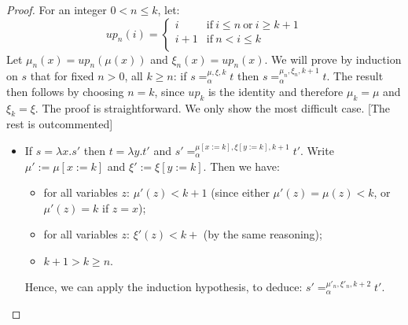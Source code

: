 \documentclass{lmcs}
\theoremstyle{theorem}\newtheorem{theorem}{Theorem}
\theoremstyle{theorem}\newtheorem{lemma}[theorem]{Lemma}
\theoremstyle{theorem}\newtheorem{corollary}[theorem]{Corollary}
\theoremstyle{definition}\newtheorem{definition}[theorem]{Definition}
\theoremstyle{definition}\newtheorem{example}[theorem]{Example}
\newcommand{\Vfree}{\mathcal{V}_{\mathit{nonb}}}
\newcommand{\Vbound}{\mathcal{V}_{\mathit{binder}}}
\newcommand{\identifier}[1]{\mathtt{#1}}
\newcommand{\afun}{\identifier{f}}
\newcommand{\avar}{x}
\newcommand{\bvar}{y}
\newcommand{\Avar}{X}
\newcommand{\abs}[2]{\lambda #1.#2}
\newcommand{\meta}[2]{#1\langle#2\rangle}
\newcommand{\tuple}[2]{\llparenthesis #1,\dots,#2 \rrparenthesis}
\begin{document}
\begin{proof}
For an integer $0 < n \leq k$, let:
\[\mathit{up}_n(i) = \left\{
\begin{array}{ll}
i & \text{if}\ i \leq n\ \text{or}\ i \geq k+1 \\
i+1 & \text{if}\ n < i \leq k \\
\end{array}
\right.
\]
Let $\mu_n(x) = \mathit{up}_n(\mu(x))$ and $\xi_n(x) = \mathit{up}_n(x)$.
We will prove by induction on $s$ that for fixed $n > 0$, all $k \geq n$:
if $s =_\alpha^{\mu,\xi,k} t$ then $s =_\alpha^{\mu_n,\xi_n,k+1} t$.
The result then follows by choosing $n = k$, since $\mathit{up}_k$ is the
identity and therefore $\mu_k = \mu$ and $\xi_k = \xi$.
The proof is straightforward. We only show the most difficult case.
[The rest is outcommented]

\begin{itemize}
\item If $s = \abs{x}{s'}$ then $t = \abs{y}{t'}$ and $s' =_\alpha^{\mu[x:=k],
  \xi[y:=k],k+1} t'$.
  Write $\mu' := \mu[x:=k]$ and $\xi' := \xi[y:=k]$. Then we have:
  \begin{itemize}
  \item for all variables $z$: $\mu'(z) < k+1$ (since either $\mu'(z) = \mu(z)
    < k$, or $\mu'(z) = k$ if $z = x$);
  \item for all variables $z$: $\xi'(z) < k+$ (by the same reasoning);
  \item $k+1 > k \geq n$. \\
  \end{itemize}
  Hence, we can apply the induction hypothesis, to deduce: $s' =_\alpha^{\mu'_n,
  \xi'_n,k+2} t'$.


\end{itemize}
\end{proof}
\end{document}
